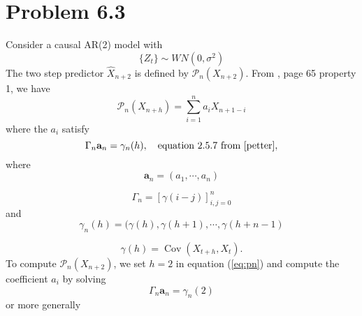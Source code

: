 \documentclass[11pt, oneside]{article}   	%
\newcommand{\Cov}{\operatorname{Cov}}
\begin{document}
 
 \section{Problem 6.3}
 Consider a causal AR(2) model with 
 \begin{equation}
 \{Z_{t} \} \sim WN(0,\sigma^{2})
  \end{equation}
 The two step predictor $\widehat{X}_{n+2}$ is defined by $\mathcal{P}_{n}(X_{n+2})$. From \cite{petter}, page 65 property 1,
 we have 
 \begin{equation}\label{eq:pn}
\mathcal{P}_{n}(X_{n+h}) = \sum_{i=1}^{n}a_{i}X_{n+1-i}
\end{equation} 
 where the $a_{i}$ satisfy
 \begin{equation}
 \Gamma_{n}\textbf{a}_{n} = \gamma_{n}(h), \quad \text{equation 2.5.7 from \cite{petter}},
 \end{equation}
 where
 \begin{equation}
 \textbf{a}_{n} = (a_{1}, \cdots,a_{n})
 \end{equation}
 
 \begin{equation}
 \Gamma_{n} = [\gamma(i-j) ]_{i,j=0}^{n}
 \end{equation}
 and 
 \begin{equation}
 \gamma_{n}(h) = (\gamma(h), \gamma(h+1),\cdots,\gamma(h+n-1)
 \end{equation}
 
 \begin{equation}
 \gamma(h) = \Cov(X_{t+h},X_{t}).
 \end{equation}
 To compute $\mathcal{P}_{n}(X_{n+2})$, we set $h = 2$ in equation (\ref{eq:pn}) and compute the coefficient $a_{i}$ by solving 
 \begin{equation}
 \Gamma_{n}\textbf{a}_{n} = \gamma_{n}(2)
 \end{equation}
 or more generally
 
\end{document}
